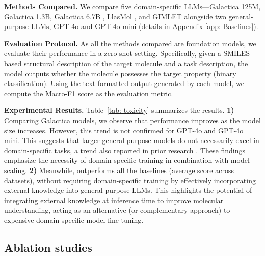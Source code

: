 \textbf{Methods Compared.}
We compare five domain-specific LLMs—Galactica 125M, Galactica 1.3B, Galactica 6.7B \cite{taylor2022galactica}, LlasMol \cite{yu2024llasmol}, and GIMLET \cite{zhao2023gimlet} alongside two general-purpose LLMs, GPT-4o and GPT-4o mini (details in Appendix \ref{app: Baselines}).

\textbf{Evaluation Protocol.}
As all the methods compared are foundation models, we evaluate their performance in a zero-shot setting. 
Specifically, given a SMILES-based structural description of the target molecule and a task description, the model outputs whether the molecule possesses the target property (binary classification).
Using the text-formatted output generated by each model, we compute the Macro-F1 score \cite{opitz2019macro} as the evaluation metric.

\textbf{Experimental Results.}
Table~\ref{tab: toxicity} summarizes the results.
\textbf{1)} Comparing Galactica models, we observe that performance improves as the model size increases. However, this trend is not confirmed for  GPT-4o and GPT-4o mini. %
This suggests that larger general-purpose models do not necessarily excel in domain-specific tasks, a trend also reported in prior research \cite{edwards2024molcap}. 
These findings emphasize the necessity of domain-specific training in combination with model scaling. %
\textbf{2)} Meanwhile, \proposed outperforms all the baselines (average score across datasets),  without requiring domain-specific training by effectively incorporating external knowledge into general-purpose LLMs.
This highlights the potential of integrating external knowledge at inference time to improve molecular understanding, acting as an alternative (or complementary approach) to expensive domain-specific model fine-tuning.


\subsection{Ablation studies}

